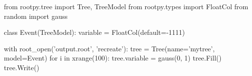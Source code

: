 \begin{footnotesize}
\begin{pyglist}[language=python,texcl=true,abovecaptionskip=0,style=vs,bgcolor=Moccasin]
from rootpy.tree import Tree, TreeModel
from rootpy.types import FloatCol
from random import gauss

class Event(TreeModel):
    variable = FloatCol(default=-1111)

with root_open('output.root', 'recreate'):
    tree = Tree(name='mytree', model=Event)
    for i in xrange(100):
        tree.variable = gauss(0, 1)
        tree.Fill()
    tree.Write()
\end{pyglist}
\end{footnotesize}
